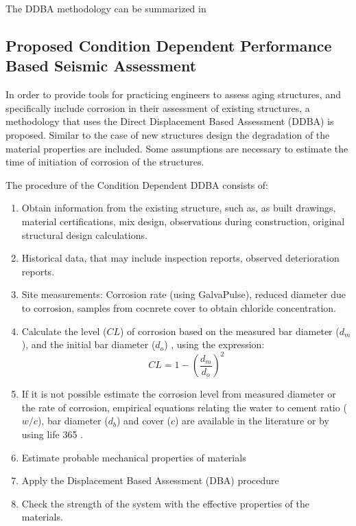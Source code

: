 The DDBA methodology can be summarized in 

\subsection{Proposed Condition Dependent Performance Based Seismic Assessment}

In order to provide tools for practicing engineers to assess aging structures, and specifically include corrosion in their assessment of existing structures, a methodology that uses the Direct Displacement Based Assessment (DDBA) is proposed. Similar to the case of new structures design the degradation of the material properties are included. Some assumptions are necessary to estimate the time of initiation of corrosion of the structures.

The procedure of the Condition Dependent DDBA consists of:

\begin{enumerate}
    \item Obtain information from the existing structure, such as, as built drawings, material certifications, mix design, observations during construction, original structural design calculations.
    \item Historical data, that may include inspection reports, observed deterioration reports.
    \item Site measurements: Corrosion rate (using GalvaPulse), reduced diameter due to corrosion, samples from cocnrete cover to obtain chloride concentration.
    \item Calculate the level ($CL$) of corrosion based on the measured bar diameter ($d_{m}$), and the initial bar diameter ($d_o$) , using the expression: 
    \begin{equation}
        CL=1-\left(\frac{d_{m}}{d_{o}}\right)^2
        \label{eq:CL_diameter}
    \end{equation}
    \item If it is not possible estimate the corrosion level from measured diameter or the rate of corrosion, empirical equations relating the water to cement ratio ($w/c$), bar diameter ($d_{b}$) and cover ($c$) are available in the literature \cite{Weyers1994}\cite{Thoft-Christensen} or by using life 365 \cite{Bentz2003}.
    \item Estimate probable mechanical properties of materials
    \item Apply the Displacement Based Assessment (DBA) procedure
    \item Check the strength of the system with the effective properties of the materials.
\end{enumerate}

